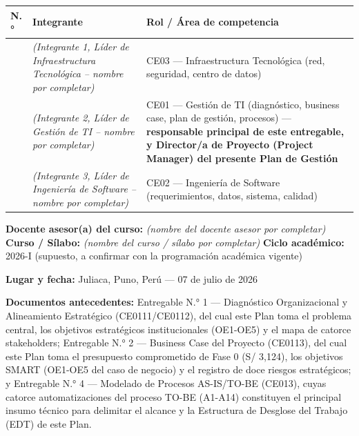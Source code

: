 \documentclass[11pt,a4paper]{article}
\begin{document}
{\small
\begin{longtable}[]{@{}
  >{\raggedright\arraybackslash}p{}
  >{\raggedright\arraybackslash}p{}
  >{\raggedright\arraybackslash}p{}@{}}
\toprule\noalign{}
\begin{minipage}[b]{\linewidth}\raggedright
N.°
\end{minipage} & \begin{minipage}[b]{\linewidth}\raggedright
Integrante
\end{minipage} & \begin{minipage}[b]{\linewidth}\raggedright
Rol / Área de competencia
\end{minipage} \\
\midrule\noalign{}
\endhead
\bottomrule\noalign{}
\endlastfoot
1 & \textit{(Integrante 1, Líder de Infraestructura Tecnológica -- nombre por completar)} & CE03 --- Infraestructura Tecnológica (red, seguridad, centro de datos) \\
2 & \textit{(Integrante 2, Líder de Gestión de TI -- nombre por completar)} & CE01 --- Gestión de TI (diagnóstico, business case, plan de gestión, procesos) --- \textbf{responsable principal de este entregable, y Director/a de Proyecto (Project Manager) del presente Plan de Gestión} \\
3 & \textit{(Integrante 3, Líder de Ingeniería de Software -- nombre por completar)} & CE02 --- Ingeniería de Software (requerimientos, datos, sistema, calidad) \\
\end{longtable}
}

\textbf{Docente asesor(a) del curso:} \textit{(nombre del docente asesor por completar)}
\textbf{Curso / Sílabo:} \textit{(nombre del curso / s\'ilabo por completar)}
\textbf{Ciclo académico:} 2026-I (supuesto, a confirmar con la programación académica vigente)

\textbf{Lugar y fecha:} Juliaca, Puno, Perú --- 07 de julio de 2026

\textbf{Documentos antecedentes:} Entregable N.° 1 --- Diagnóstico Organizacional y Alineamiento Estratégico (CE0111/CE0112), del cual este Plan toma el problema central, los objetivos estratégicos institucionales (OE1-OE5) y el mapa de catorce stakeholders; Entregable N.° 2 --- Business Case del Proyecto (CE0113), del cual este Plan toma el presupuesto comprometido de Fase 0 (S/ 3,124), los objetivos SMART (OE1-OE5 del caso de negocio) y el registro de doce riesgos estratégicos; y Entregable N.° 4 --- Modelado de Procesos AS-IS/TO-BE (CE013), cuyas catorce automatizaciones del proceso TO-BE (A1-A14) constituyen el principal insumo técnico para delimitar el alcance y la Estructura de Desglose del Trabajo (EDT) de este Plan.
\end{document}
